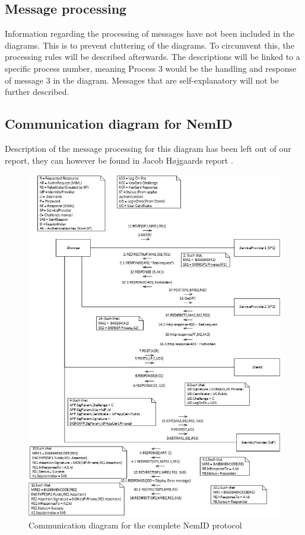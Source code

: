 \documentclass[twosided]{report}
\begin{document}
\subsection{Message processing}
Information regarding the processing of messages have not been included in the diagrams. This is to prevent cluttering of the diagrams. To circumvent this, the processing rules will be described afterwards. The descriptions will be linked to a specific process number, meaning Process 3 would be the handling and response of message 3 in the diagram. Messages that are self-explanatory will not be further described.

\subsection{Communication diagram for NemID}
Description of the message processing for this diagram has been left out of our report, they can however be found in Jacob H{\o}jgaards report \cite{jacob}.

\begin{figure}[H]
	\centering
	\includegraphics{images/Communication-Jacob.jpg}
	\caption[Communication diagram for the complete NemID protocol]{Communication diagram for the complete NemID protocol \cite{jacob}}
	\label{fig:jacobCommunication}
\end{figure}
\end{document}
